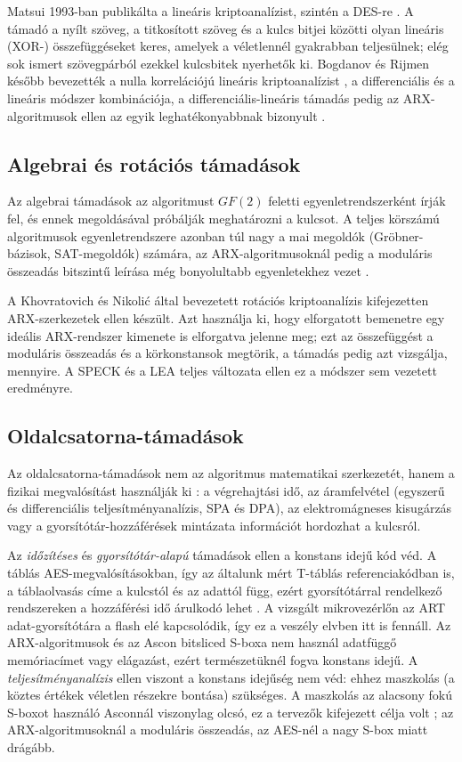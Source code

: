 \documentclass[a4paper,12pt]{report}
\theoremstyle{definition}
\theoremstyle{remark}
\begin{document}
Matsui 1993-ban publikálta a lineáris kriptoanalízist, szintén a DES-re \cite{Matsui1993}. A támadó a nyílt szöveg, a titkosított szöveg és a kulcs bitjei közötti olyan lineáris (XOR-) összefüggéseket keres, amelyek a véletlennél gyakrabban teljesülnek; elég sok ismert szövegpárból ezekkel kulcsbitek nyerhetők ki. Bogdanov és Rijmen később bevezették a nulla korrelációjú lineáris kriptoanalízist \cite{Bogdanov2014}, a differenciális és a lineáris módszer kombinációja, a differenciális-lineáris támadás pedig az ARX-algoritmusok ellen az egyik leghatékonyabbnak bizonyult \cite{Chen2023}.

\subsection{Algebrai és rotációs támadások}

Az algebrai támadások az algoritmust $GF(2)$ feletti egyenletrendszerként írják fel, és ennek megoldásával próbálják meghatározni a kulcsot. A teljes körszámú algoritmusok egyenletrendszere azonban túl nagy a mai megoldók (Gröbner-bázisok, SAT-megoldók) számára, az ARX-algoritmusoknál pedig a moduláris összeadás bitszintű leírása még bonyolultabb egyenletekhez vezet \cite{Biryukov2017}.

A Khovratovich és Nikolić által bevezetett rotációs kriptoanalízis \cite{Khovratovich2010} kifejezetten ARX-szerkezetek ellen készült. Azt használja ki, hogy elforgatott bemenetre egy ideális ARX-rendszer kimenete is elforgatva jelenne meg; ezt az összefüggést a moduláris összeadás és a körkonstansok megtörik, a támadás pedig azt vizsgálja, mennyire. A SPECK és a LEA teljes változata ellen ez a módszer sem vezetett eredményre.

\subsection{Oldalcsatorna-támadások}

Az oldalcsatorna-támadások nem az algoritmus matematikai szerkezetét, hanem a fizikai megvalósítást használják ki \cite{Kocher1996}: a végrehajtási idő, az áramfelvétel (egyszerű és differenciális teljesítményanalízis, SPA és DPA), az elektromágneses kisugárzás vagy a gyorsítótár-hozzáférések mintázata információt hordozhat a kulcsról.

Az \emph{időzítéses} és \emph{gyorsítótár-alapú} támadások ellen a konstans idejű kód véd. A táblás AES-megvalósításokban, így az általunk mért T-táblás referenciakódban is, a táblaolvasás címe a kulcstól és az adattól függ, ezért gyorsítótárral rendelkező rendszereken a hozzáférési idő árulkodó lehet \cite{Bernstein2005}. A vizsgált mikrovezérlőn az ART adat-gyorsítótára a flash elé kapcsolódik, így ez a veszély elvben itt is fennáll. Az ARX-algoritmusok és az Ascon bitsliced S-boxa nem használ adatfüggő memóriacímet vagy elágazást, ezért természetüknél fogva konstans idejű. A \emph{teljesítményanalízis} ellen viszont a konstans idejűség nem véd: ehhez maszkolás (a köztes értékek véletlen részekre bontása) szükséges. A maszkolás az alacsony fokú S-boxot használó Asconnál viszonylag olcsó, ez a tervezők kifejezett célja volt \cite{Dobraunig2021}; az ARX-algoritmusoknál a moduláris összeadás, az AES-nél a nagy S-box miatt drágább.
\end{document}
